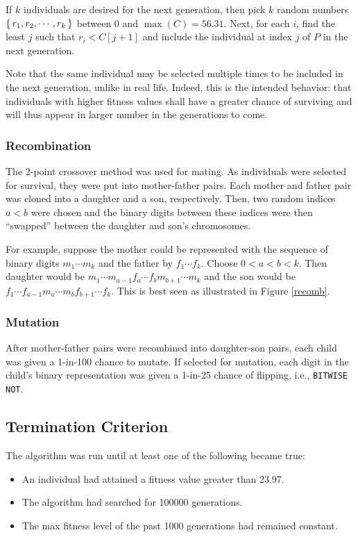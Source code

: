 \documentclass{article}
\begin{document}
      If $k$ individuals are desired for the next generation, then pick $k$
      random numbers $\set{r_1,r_2,\cdots,r_k}$ between $0$ and $\max(C)=56.31$.
      Next, for each $i$, find the least $j$ such that $r_i < C[j+1]$ and
      include the individual at index $j$ of $P$ in the next generation.

      Note that the same individual may be selected multiple times to be
      included in the next generation, unlike in real life. Indeed, this is the
      intended behavior: that individuals with higher fitness values shall have
      a greater chance of surviving and will thus appear in larger number in the
      generations to come.

    \subsubsection{Recombination}
      The 2-point crossover method was used for mating. As individuals were
      selected for survival, they were put into mother-father pairs. Each
      mother and father pair was cloned into a daughter and a son, respectively.
      Then, two random indices $a<b$ were chosen and the binary digits between
      these indices were then ``swapped'' between the daughter and son's
      chromosomes.

      For example, suppose the mother could be represented with the
      sequence of binary digits $m_1\cdots m_k$ and the father by $f_1\cdots
      f_k$. Choose $0<a<b<k$. Then daughter would be $m_1\cdots m_{a-1}f_a\cdots
      f_bm_{b+1}\cdots m_k$ and the son would be $f_1\cdots f_{a-1}m_a\cdots m_b
      f_{b+1}\cdots f_k$. This is best seen as illustrated in Figure
      \ref{recomb}.
      

    \subsubsection{Mutation}
      After mother-father pairs were recombined into daughter-son pairs, each
      child was given a 1-in-100 chance to mutate. If selected for mutation,
      each digit in the child's binary representation was given a 1-in-25
      chance of flipping, i.e., \texttt{BITWISE NOT}.

  \subsection{Termination Criterion}
    The algorithm was run until at least one of the following became true:
    \begin{itemize}
      \renewcommand\labelitemi{$\star$}
      \item{
        An individual had attained a fitness value greater than \num{23.97}.
      }
      \item{
        The algorithm had searched for \num{100000} generations.
      }
      \item{
        The max fitness level of the past \num{1000} generations had remained
        constant.
      }
    \end{itemize}
\end{document}
